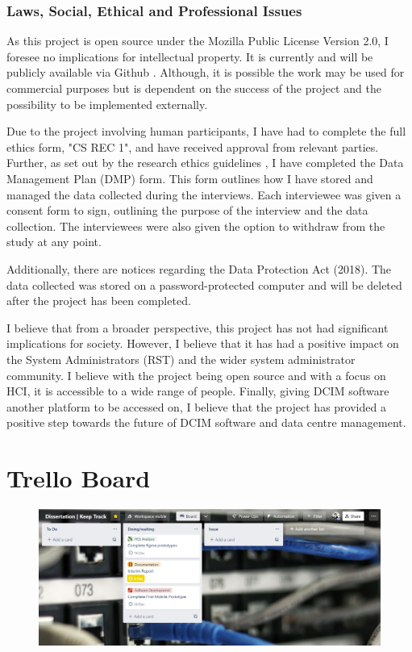 \documentclass [11pt,a4paper]{article}
\begin{document}
\subsubsection{Laws, Social, Ethical and Professional Issues}
\label{sec:computer_laws}
As this project is open source under the Mozilla Public License Version 2.0, I foresee no implications for intellectual property. It is currently and will be publicly available via Github \cite{keeptrackgithub}. Although, it is possible the work may be used for commercial purposes but is dependent on the success of the project and the possibility to be implemented externally.

Due to the project involving human participants, I have had to complete the full ethics form, "CS REC 1", and have received approval from relevant parties. Further, as set out by the research ethics guidelines \cite{ethicsguidelines}, I have completed the Data Management Plan (DMP) form. This form outlines how I have stored and managed the data collected during the interviews. Each interviewee was given a consent form to sign, outlining the purpose of the interview and the data collection. The interviewees were also given the option to withdraw from the study at any point.

Additionally, there are notices regarding the Data Protection Act (2018). The  data collected was stored on a password-protected computer and will be deleted after the project has been completed.

I believe that from a broader perspective, this project has not had significant implications for society. However, I believe that it has had a positive impact on the System Administrators (RST) and the wider system administrator community. I believe with the project being open source and with a focus on HCI, it is accessible to a wide range of people. Finally, giving DCIM software another platform to be accessed on, I believe that the project has provided a positive step towards the future of DCIM software and data centre management.
\pagebreak


 

\pagebreak
{}
\appendix
\section{Trello Board}
\label{sec:trello_board}
\begin{figure}[H]
    \centering
    \includegraphics[width=1\textwidth]{images/trello-board.png}
\end{figure}   
\end{document}
